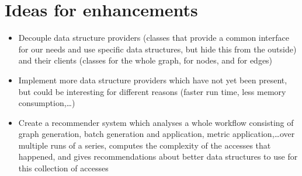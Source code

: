 \section{Ideas for enhancements}
	\begin{itemize}
		\item Decouple data structure providers (classes that provide a common interface for
			our needs and use specific data structures, but hide this from the outside) and their
			clients (classes for the whole graph, for nodes, and for edges)
		\item Implement more data structure providers which have not yet been present, but could
			be interesting for different reasons (faster run time, less memory consumption,\ldots)
		\item Create a recommender system which analyses a whole workflow consisting of graph
			generation, batch generation and application, metric application,\ldots over multiple
			runs of a series, computes the complexity of the accesses that happened, and gives
			recommendations about better data structures to use for this collection of accesses
	\end{itemize}